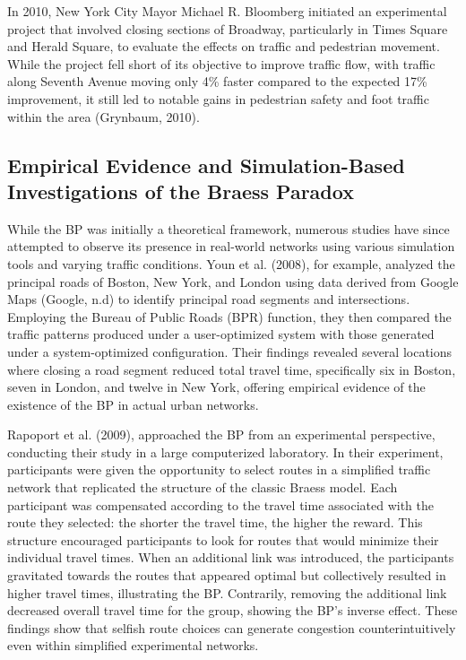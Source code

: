 In 2010, New York City Mayor Michael R. Bloomberg initiated an experimental project that involved closing sections of Broadway, particularly in Times Square and Herald Square, to evaluate the effects on traffic and pedestrian movement. While the project fell short of its objective to improve traffic flow, with traffic along Seventh Avenue moving only 4\% faster compared to the expected 17\% improvement, it still led to notable gains in pedestrian safety and foot traffic within the area (Grynbaum, 2010). 

\subsection{Empirical Evidence and Simulation-Based Investigations of the Braess Paradox}
\label{chap:bp_empirical}

While the BP was initially a theoretical framework, numerous studies have since attempted to observe its presence in real-world networks using various simulation tools and varying traffic conditions. Youn et al. (2008), for example, analyzed the principal roads of Boston, New York, and London using data derived from Google Maps (Google, n.d) to identify principal road segments and intersections. Employing the Bureau of Public Roads (BPR) function, they then compared the traffic patterns produced under a user-optimized system with those generated under a system-optimized configuration. Their findings revealed several locations where closing a road segment reduced total travel time, specifically six in Boston, seven in London, and twelve in New York, offering empirical evidence of the existence of the BP in actual urban networks. 

Rapoport et al. (2009), approached the BP from an experimental perspective, conducting their study in a large computerized laboratory. In their experiment, participants were given the opportunity to select routes in a simplified traffic network that replicated the structure of the classic Braess model. Each participant was compensated according to the travel time associated with the route they selected: the shorter the travel time, the higher the reward. This structure encouraged participants to look for routes that would minimize their individual travel times. When an additional link was introduced, the participants gravitated towards the routes that appeared optimal but collectively resulted in higher travel times, illustrating the BP. Contrarily, removing the additional link decreased overall travel time for the group, showing the BP's inverse effect. These findings show that selfish route choices can generate congestion counterintuitively even within simplified experimental networks.

